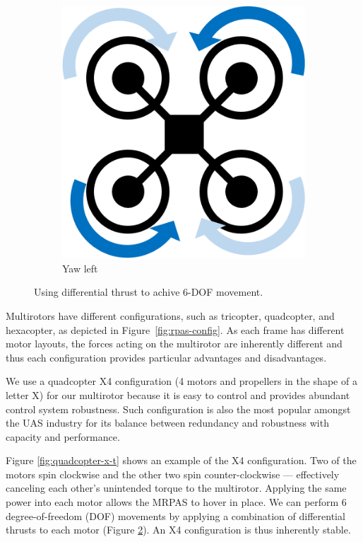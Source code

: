\begin{figure}[h]
	~
	\begin{subfigure}[b]{0.3\textwidth}
		\centering
		\includegraphics[scale=0.4]{img/drone_x_yaw}
		\caption{Yaw left}
		\label{fig:x-yaw}
	\end{subfigure}
	
	\caption{Using differential thrust to achive 6-DOF movement. }
	\label{fig:rpas_6dof}
\end{figure}

Multirotors have different configurations, such as tricopter, quadcopter, and hexacopter, as depicted in Figure~\ref{fig:rpas-config}. As each frame has different motor layouts, the forces acting on the multirotor are inherently different and thus each configuration provides particular advantages and disadvantages.

We use a quadcopter X4 configuration (4 motors and propellers in the shape of a letter X) for our multirotor because it is easy to control and provides abundant control system robustness. Such configuration is also the most popular amongst the UAS industry for its balance between redundancy and robustness with capacity and performance.

Figure \ref{fig:quadcopter-x-t} shows an example of the X4 configuration. Two of the motors spin clockwise and the other two spin counter-clockwise --- effectively canceling each other's unintended torque to the multirotor. Applying the same power into each motor allows the MRPAS to hover in place. We can perform 6 degree-of-freedom (DOF) movements by applying a combination of differential thrusts to each motor (Figure \ref{fig:rpas_6dof}). An X4 configuration is thus inherently stable.

